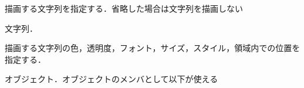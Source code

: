 \begin{description}
{\nopagebreak
\item[\texttt{Text}] \mbox{}
    \vspace{-1zw}
    \begin{description}
    \setlength{\itemsep}{-1.5\itemsep}
    \item[説明] 描画する文字列を指定する．省略した場合は文字列を描画しない
    \item[値] 文字列．
    \end{description}
}
\item[\texttt{Font}] \mbox{}
    \vspace{-1zw}
    \begin{description}
    \setlength{\itemsep}{-1.5\itemsep}
    \item[説明] 描画する文字列の色，透明度，フォント，サイズ，スタイル，領域内での位置を指定する．
    \item[値] オブジェクト．オブジェクトのメンバとして以下が使える
    

\end{description}
\end{description}
